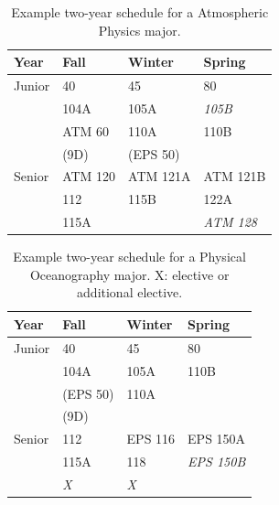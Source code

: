 \documentclass[12pt]{article}
\begin{document}
\begin{table}[htbp]
\caption{\label{tbl:sched-atmospheric} Example two-year schedule for a
  Atmospheric Physics major.}
\begin{center}
\begin{tabular}{|l|l|l|l|}
\hline
Year      & Fall    & Winter & Spring \\
\hline
Junior    & 40         & 45           & 80 \\
          & 104A       & 105A         & {\it 105B} \\
          & ATM 60     & 110A         & 110B \\
          & (9D)       & (EPS 50)     & \\
\hline
Senior   & ATM 120       & ATM 121A     & ATM 121B \\
         & 112         & 115B       & 122A \\
         & 115A          &              & {\it ATM 128}\\
\hline
\end{tabular}
\end{center}
\end{table}

\begin{table}[htbp]
\caption{\label{tbl:sched-oceanography} Example two-year schedule for a
  Physical Oceanography major.  X:  elective or additional elective.}
\begin{center}
\begin{tabular}{|l|l|l|l|}
\hline
Year      & Fall    & Winter & Spring \\
\hline
Junior    & 40         & 45             & 80 \\
          & 104A       & 105A           & 110B \\
          & (EPS 50)   & 110A           & \\
          & (9D)       &                & \\
\hline
Senior   & 112       & EPS 116        & EPS 150A \\
         & 115A        & 118            & {\it EPS 150B} \\
         & {\it X}     & {\it X}        & \\
\hline
\end{tabular}
\end{center}
\end{table}
\end{document}
